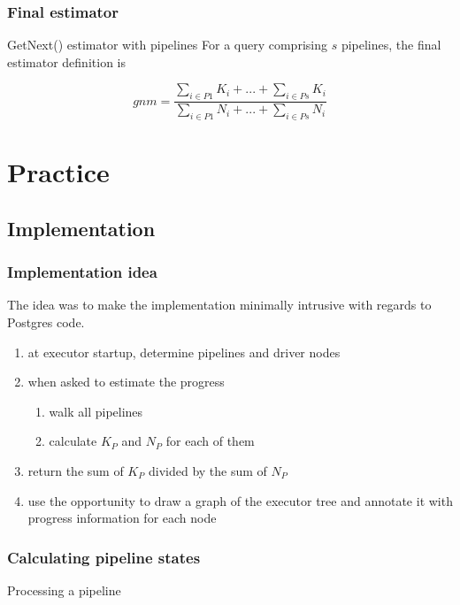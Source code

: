 \documentclass{beamer}
\begin{document}
\begin{frame}
  \frametitle{Final estimator}

  \begin{block}{GetNext() estimator with pipelines}
    For a query comprising $s$ pipelines, the final estimator definition is

    \begin{equation*}
      gnm = \frac{\sum\limits_{i \in P1} K_{i} + ... + \sum\limits_{i \in Ps} K_{i}}
      {\sum\limits_{i \in P1} N_{i} + ... + \sum\limits_{i \in Ps} N_{i}}
    \end{equation*}
  \end{block}
\end{frame}

\section{Practice}
\subsection{Implementation}

\begin{frame}
  \frametitle{Implementation idea}

  The idea was to make the implementation minimally intrusive with regards to
  Postgres code.

  \begin{enumerate}
  \item at executor startup, determine pipelines and driver nodes
  \item when asked to estimate the progress
    \begin{enumerate}
    \item walk all pipelines
    \item calculate $K_{P}$ and $N_{P}$ for each of them
    \end{enumerate}
  \item return the sum of $K_{P}$ divided by the sum of $N_{P}$
  \item use the opportunity to draw a graph of the executor tree and annotate
    it with progress information for each node
  \end{enumerate}
\end{frame}

\begin{frame}[fragile]
  \frametitle{Calculating pipeline states}

\begin{block}{Processing a pipeline}
\begin{semiverbatim}
\end{semiverbatim}
\end{block}
\end{frame}
\end{document}
